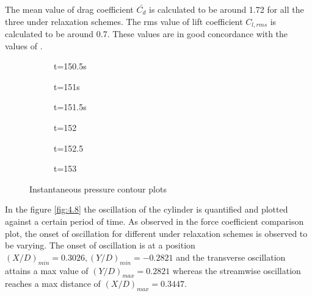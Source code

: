 The mean value of drag coefficient $\bar{C_d}$ is calculated to be around 1.72 for all the three under relaxation schemes. The rms value of lift coefficient $C_{l,rms}$ is calculated to be around 0.7. These values are in good concordance with the values of \citet{zhou1999vortex}.

\begin{figure}[H]
\centering
	\begin{subfigure}[t]{7cm}
		\caption{t=150.5s}
	\end{subfigure}
	\begin{subfigure}[t]{7cm}
		\caption{t=151s}
	\end{subfigure}
	
	\begin{subfigure}[t]{7cm}
		\caption{t=151.5s}
	\end{subfigure}
	\begin{subfigure}[t]{7cm}
		\caption{t=152}
	\end{subfigure}
	
	\begin{subfigure}[t]{7cm}
		\caption{t=152.5}
	\end{subfigure}
	\begin{subfigure}[t]{7cm}
		\caption{t=153}
	\end{subfigure}
\caption{Instantaneous pressure contour plots}
\label{fig:4.7}
\end{figure}

In the figure \ref{fig:4.8} the oscillation of the cylinder is quantified and plotted against a certain period of time. As observed in the force coefficient comparison plot, the onset of oscillation for different under relaxation schemes is observed to be varying. The onset of oscillation is at a position $(X/D)_{min}=0.3026, (Y/D)_{min}=-0.2821$ and the transverse oscillation attains a max value of $(Y/D)_{max}=0.2821$ whereas the streamwise oscillation reaches a max distance of $(X/D)_{max}=0.3447$.

